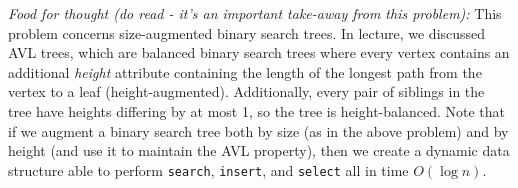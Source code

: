\documentclass[11pt]{article}
\begin{document}
\begin{enumerate}
\begin{enumerate}
    \end{enumerate}
    
    \emph{Food for thought (do read - it's an important take-away from this problem):} This problem concerns size-augmented binary search trees. In lecture, we discussed AVL trees, which are balanced binary search trees where every vertex contains an additional \textit{height} attribute containing the length of the longest path from the vertex to a leaf (height-augmented). Additionally, every pair of siblings in the tree have heights differing by at most 1, so the tree is height-balanced. Note that if we augment a binary search tree both by size (as in the above problem) and by height (and use it to maintain the AVL property), then we create a dynamic data structure able to perform \texttt{search}, \texttt{insert}, and \texttt{select} all in time $O(\log n)$. 
    



\end{enumerate}
\end{document}
